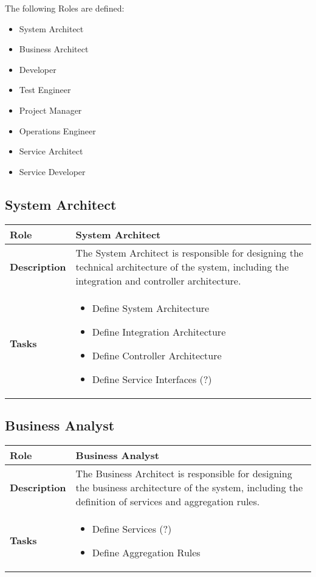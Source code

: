 The following Roles are defined:
\begin{itemize}
	\item System Architect 
	\item Business Architect
	\item Developer
	\item Test Engineer
	\item Project Manager
	\item Operations Engineer 
	\item Service Architect 
	\item Service Developer
\end{itemize}

\subsection{System Architect} 
\begin{minipage}{\textwidth}
\label{table:ch6_Role_System_Architect}
\begin{tabular}
	{|m{2cm}|m{10cm}|} \hline \bfseries Role & System Architect\\
	\hline \bfseries Description & The System Architect is responsible for designing the technical architecture of the system, including the integration and controller architecture.\\
	\hline \bfseries Tasks & 
	\begin{itemize}
		\item Define System Architecture 
		\item Define Integration Architecture
		\item Define Controller Architecture
		\item Define Service Interfaces (?)
	\end{itemize}
	\\
	\hline 
\end{tabular}
\end{minipage}

\subsection{Business Analyst}
\begin{minipage}{\textwidth}
 \label{table:ch6_Role_Business_Analysist}
\begin{tabular}
	{|m{2cm}|m{10cm}|} \hline \bfseries Role & Business Analyst\\
	\hline \bfseries Description & The Business Architect is responsible for designing the business architecture of the system, including the definition of services and aggregation rules.\\
	\hline \bfseries Tasks & 
	\begin{itemize}
		\item Define Services (?)
		\item Define Aggregation Rules
	\end{itemize}
	\\
	\hline 
\end{tabular}
\end{minipage}

